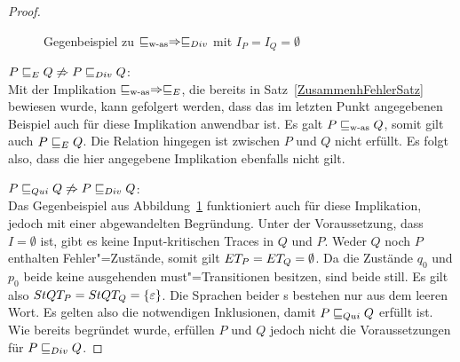 \begin{proof}
\begin{figure}[htbp]
\begin{center}
      \caption{Gegenbeispiel zu $\sqsubseteq _{\mathrm{w}\text{-}\mathrm{as}} \Rightarrow  \sqsubseteq  _{Div}$ mit $I_P = I_Q =
      \emptyset$}
      \label{wasDivGegenBsp}
    \end{center}
  \end{figure}

  $P  \sqsubseteq  _E Q \not\Rightarrow P  \sqsubseteq  _{Div} Q$:\\
  Mit der Implikation $\sqsubseteq _{\mathrm{w}\text{-}\mathrm{as}} \Rightarrow  \sqsubseteq  _E$, die bereits in
  Satz~\ref{ZusammenhFehlerSatz} bewiesen wurde, kann gefolgert werden, dass
  das im letzten Punkt angegebenen Beispiel auch für diese Implikation
  anwendbar ist. Es galt $P \sqsubseteq _{\mathrm{w}\text{-}\mathrm{as}} Q$, somit gilt auch $P  \sqsubseteq  _E Q$. Die
  Relation \DRel{} hingegen ist zwischen $P$ und $Q$ nicht erfüllt. Es folgt
  also, dass die hier angegebene Implikation ebenfalls nicht gilt.

  $P  \sqsubseteq  _{Qui} Q \not\Rightarrow P  \sqsubseteq  _{Div} Q$:\\
  Das Gegenbeispiel aus Abbildung~\ref{wasDivGegenBsp} funktioniert auch für
  diese Implikation, jedoch mit einer abgewandelten Begründung. Unter der
  Voraussetzung, dass $I=\emptyset$ ist, gibt es keine Input-kritischen Traces
  in $Q$ und $P$. Weder $Q$ noch $P$ enthalten Fehler"=Zustände, somit gilt
  $ET _P = ET _Q = \emptyset$. Da die Zustände $q_0$ und $p_0$ beide keine
  ausgehenden must"=Transitionen besitzen, sind beide still. Es gilt also
  $StQT _P = StQT _Q = \{\varepsilon\}$. Die Sprachen beider \MEIO{}s
  bestehen nur aus dem leeren Wort. Es gelten also die notwendigen
  Inklusionen, damit $P  \sqsubseteq  _{Qui} Q$ erfüllt ist. Wie bereits begründet wurde,
  erfüllen $P$ und $Q$ jedoch nicht die Voraussetzungen für $P  \sqsubseteq  _{Div} Q$.


\end{proof}
